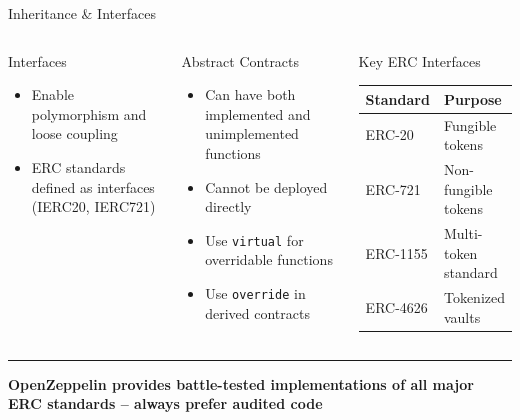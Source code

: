 \documentclass[8pt,aspectratio=169]{beamer}
\newcommand{\bottomnote}[1]{\vfill\vspace{-2mm}\textcolor{mllavender2}{\rule{\textwidth}{0.4pt}}\vspace{1mm}\footnotesize\textbf{#1}}
\begin{document}
\begin{frame}{Inheritance \& Interfaces}
\begin{columns}
\begin{block}{Interfaces}
\begin{itemize}
  \item Enable polymorphism and loose coupling
  \item ERC standards defined as interfaces (IERC20, IERC721)
\end{itemize}
\end{block}
\vspace{2mm}
\begin{block}{Abstract Contracts}
\begin{itemize}\small
  \item Can have both implemented and unimplemented functions
  \item Cannot be deployed directly
  \item Use \texttt{virtual} for overridable functions
  \item Use \texttt{override} in derived contracts
\end{itemize}
\end{block}
\vspace{2mm}
\begin{block}{Key ERC Interfaces}
\small
\begin{tabular}{@{}ll@{}}
\toprule
\textbf{Standard} & \textbf{Purpose} \\
\midrule
ERC-20 & Fungible tokens \\
ERC-721 & Non-fungible tokens \\
ERC-1155 & Multi-token standard \\
ERC-4626 & Tokenized vaults \\
\bottomrule
\end{tabular}
\end{block}
\end{columns}
\bottomnote{OpenZeppelin provides battle-tested implementations of all major ERC standards -- always prefer audited code}
\end{frame}
\end{document}
